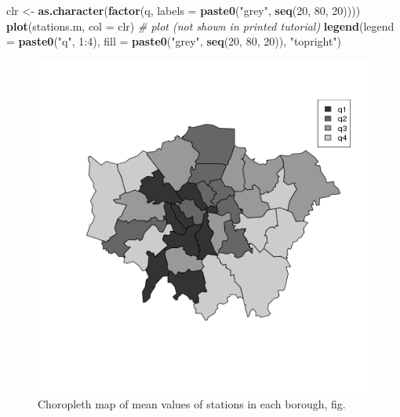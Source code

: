\documentclass[]{article}
\newenvironment{Shaded}{}{}
\newcommand{\KeywordTok}[1]{\textcolor[rgb]{0.00,0.44,0.13}{\textbf{{#1}}}}
\newcommand{\DataTypeTok}[1]{\textcolor[rgb]{0.56,0.13,0.00}{{#1}}}
\newcommand{\DecValTok}[1]{\textcolor[rgb]{0.25,0.63,0.44}{{#1}}}
\newcommand{\StringTok}[1]{\textcolor[rgb]{0.25,0.44,0.63}{{#1}}}
\newcommand{\CommentTok}[1]{\textcolor[rgb]{0.38,0.63,0.69}{\textit{{#1}}}}
\newcommand{\NormalTok}[1]{{#1}}
\begin{document}
\begin{Shaded}
\begin{Highlighting}[]
\NormalTok{clr <-}\StringTok{ }\KeywordTok{as.character}\NormalTok{(}\KeywordTok{factor}\NormalTok{(q, }\DataTypeTok{labels =} \KeywordTok{paste0}\NormalTok{(}\StringTok{"grey"}\NormalTok{, }\KeywordTok{seq}\NormalTok{(}\DecValTok{20}\NormalTok{, }\DecValTok{80}\NormalTok{, }\DecValTok{20}\NormalTok{))))}
\KeywordTok{plot}\NormalTok{(stations.m, }\DataTypeTok{col =} \NormalTok{clr)  }\CommentTok{# plot (not shown in printed tutorial)}
\KeywordTok{legend}\NormalTok{(}\DataTypeTok{legend =} \KeywordTok{paste0}\NormalTok{(}\StringTok{"q"}\NormalTok{, }\DecValTok{1}\NormalTok{:}\DecValTok{4}\NormalTok{), }\DataTypeTok{fill =} \KeywordTok{paste0}\NormalTok{(}\StringTok{"grey"}\NormalTok{, }\KeywordTok{seq}\NormalTok{(}\DecValTok{20}\NormalTok{, }\DecValTok{80}\NormalTok{, }\DecValTok{20}\NormalTok{)), }\StringTok{"topright"}\NormalTok{)}
\end{Highlighting}
\end{Shaded}

\begin{figure}[htbp]
\centering
\includegraphics{figure/Choropleth_map_of_mean_values_of_stations_in_each_borough__fig_.png}
\caption{Choropleth map of mean values of stations in each
borough, fig.}
\end{figure}
\end{document}
